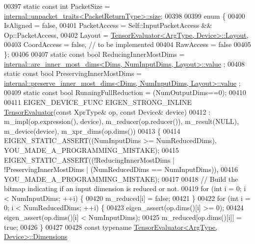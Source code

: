 \begin{DoxyCode}
00397   \textcolor{keyword}{static} \textcolor{keyword}{const} \textcolor{keywordtype}{int} PacketSize = 
      \hyperlink{struct_eigen_1_1internal_1_1unpacket__traits}{internal::unpacket\_traits<PacketReturnType>::size};
00398 
00399   \textcolor{keyword}{enum} \{
00400     IsAligned = \textcolor{keyword}{false},
00401     PacketAccess = Self::InputPacketAccess && Op::PacketAccess,
00402     Layout = \hyperlink{struct_eigen_1_1_tensor_evaluator}{TensorEvaluator<ArgType, Device>::Layout},
00403     CoordAccess = \textcolor{keyword}{false},  \textcolor{comment}{// to be implemented}
00404     RawAccess = \textcolor{keyword}{false}
00405   \};
00406 
00407   \textcolor{keyword}{static} \textcolor{keyword}{const} \textcolor{keywordtype}{bool} ReducingInnerMostDims = 
      \hyperlink{struct_eigen_1_1internal_1_1are__inner__most__dims}{internal::are\_inner\_most\_dims<Dims, NumInputDims, Layout>::value}
      ;
00408   \textcolor{keyword}{static} \textcolor{keyword}{const} \textcolor{keywordtype}{bool} PreservingInnerMostDims = 
      \hyperlink{struct_eigen_1_1internal_1_1preserve__inner__most__dims}{internal::preserve\_inner\_most\_dims<Dims, NumInputDims, Layout>::value}
      ;
00409   \textcolor{keyword}{static} \textcolor{keyword}{const} \textcolor{keywordtype}{bool} RunningFullReduction = (NumOutputDims==0);
00410 
00411   EIGEN\_DEVICE\_FUNC EIGEN\_STRONG\_INLINE \hyperlink{struct_eigen_1_1_tensor_evaluator}{TensorEvaluator}(\textcolor{keyword}{const} XprType& op, \textcolor{keyword}{const} Device& 
      device)
00412       : m\_impl(op.expression(), device), m\_reducer(op.reducer()), m\_result(NULL), m\_device(device), 
      m\_xpr\_dims(op.dims())
00413   \{
00414     EIGEN\_STATIC\_ASSERT((NumInputDims >= NumReducedDims), YOU\_MADE\_A\_PROGRAMMING\_MISTAKE);
00415     EIGEN\_STATIC\_ASSERT((!ReducingInnerMostDims | !PreservingInnerMostDims | (NumReducedDims == 
      NumInputDims)),
00416                         YOU\_MADE\_A\_PROGRAMMING\_MISTAKE);
00417 
00418     \textcolor{comment}{// Build the bitmap indicating if an input dimension is reduced or not.}
00419     \textcolor{keywordflow}{for} (\textcolor{keywordtype}{int} i = 0; i < NumInputDims; ++i) \{
00420       m\_reduced[i] = \textcolor{keyword}{false};
00421     \}
00422     \textcolor{keywordflow}{for} (\textcolor{keywordtype}{int} i = 0; i < NumReducedDims; ++i) \{
00423       eigen\_assert(op.dims()[i] >= 0);
00424       eigen\_assert(op.dims()[i] < NumInputDims);
00425       m\_reduced[op.dims()[i]] = \textcolor{keyword}{true};
00426     \}
00427 
00428     \textcolor{keyword}{const} \textcolor{keyword}{typename} \hyperlink{struct_eigen_1_1_tensor_evaluator}{TensorEvaluator<ArgType, Device>::Dimensions}

\end{DoxyCode}
